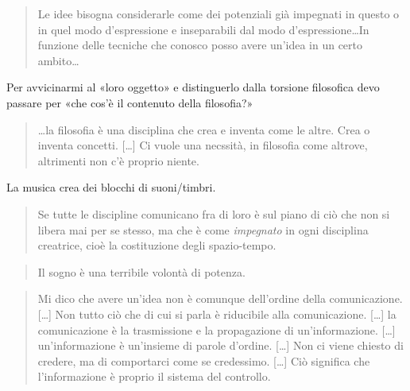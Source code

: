 \begin{quote}
\begin{sf}
\small
  Le idee bisogna considerarle come dei potenziali già impegnati in questo o in
  quel modo d'espressione e inseparabili dal modo d'espressione\ldots In funzione
  delle tecniche che conosco posso avere un'idea in un certo ambito\ldots
  \cite{deleuze2009}
  \end{sf}
\end{quote}

Per avvicinarmi al «loro oggetto» e distinguerlo dalla torsione filosofica devo
passare per «che cos'è il contenuto della filosofia?»

\begin{quote}
\begin{sf}
\small
  \ldots la filosofia è una disciplina che crea e inventa come le altre. Crea o
  inventa concetti. [\ldots] Ci vuole una necssità, in filosofia come altrove, altrimenti non c'è proprio niente.
  \cite{deleuze2009}
  \end{sf}
\end{quote}

La musica crea dei blocchi di suoni/timbri.

\begin{quote}
\begin{sf}
\small
  Se tutte le discipline comunicano fra di loro è sul piano di ciò che non si
  libera mai per se stesso, ma che è come \emph{impegnato} in ogni disciplina
  creatrice, cioè la costituzione degli spazio-tempo.
  \cite{deleuze2009}
  \end{sf}
\end{quote}

\begin{quote}
\begin{sf}
\small
  Il sogno è una terribile volontà di potenza.
  \cite{deleuze2009}
  \end{sf}
\end{quote}

\begin{quote}
\begin{sf}
\small
  Mi dico che avere un'idea non è comunque dell'ordine della comunicazione.
  [\ldots] Non tutto ciò che di cui si parla è riducibile alla comunicazione.
  [\ldots] la comunicazione è la trasmissione e la propagazione di
  un'informazione. [\ldots] un'informazione è un'insieme di parole d'ordine.
  [\ldots] Non ci viene chiesto di credere, ma di comportarci come se credessimo.
  [\ldots] Ciò significa che l'informazione è proprio il sistema del controllo.
  \cite{deleuze2009}
  \end{sf}
\end{quote}

